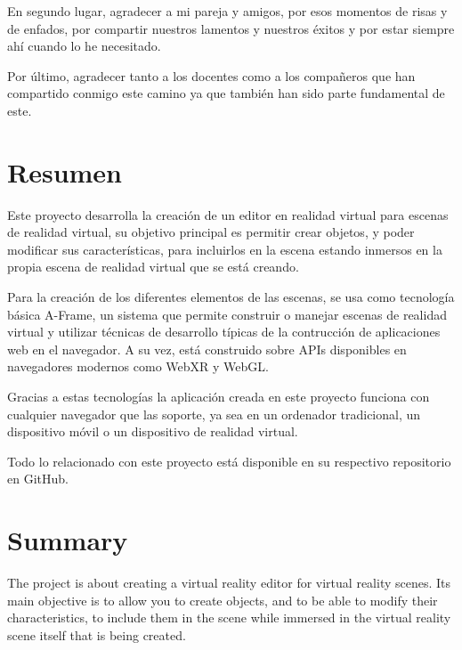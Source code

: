 \documentclass[a4paper, 12pt]{book}
\begin{document}
En segundo lugar, agradecer a mi pareja y amigos, por esos  momentos de risas y de enfados, por compartir nuestros lamentos y nuestros éxitos y por estar siempre ahí cuando lo he necesitado.

Por último, agradecer tanto a los docentes como a los compañeros que han compartido conmigo este camino ya que también han sido parte fundamental de este.


\chapter*{Resumen}

Este proyecto desarrolla la creación de un editor en realidad virtual para escenas de realidad virtual, su objetivo principal es permitir crear objetos, y poder modificar sus características, para incluirlos en la escena estando inmersos en la propia escena de realidad virtual que se está creando.

Para la creación de los diferentes elementos de las escenas, se usa como tecnología básica A-Frame, un sistema que permite construir o manejar escenas de realidad virtual y utilizar técnicas de desarrollo típicas de la contrucción de aplicaciones web en el navegador. A su vez, está construido sobre APIs disponibles en navegadores modernos como WebXR y WebGL. 

Gracias a estas tecnologías la aplicación creada en este proyecto funciona con cualquier navegador que las soporte, ya sea en un ordenador tradicional, un dispositivo móvil o un dispositivo de realidad virtual.

Todo lo relacionado con este proyecto está disponible en su respectivo repositorio en GitHub.


\chapter*{Summary}

The project is about creating a virtual reality editor for virtual reality scenes. Its main objective is to allow you to create objects, and to be able to modify their characteristics, to include them in the scene while immersed in the virtual reality scene itself that is being created.
\end{document}
